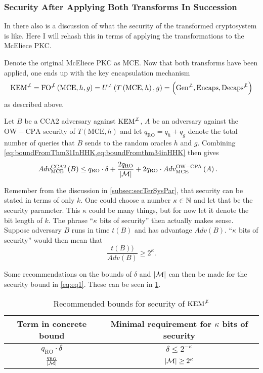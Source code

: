\subsubsection{Security After Applying Both Transforms In Succession}
\label{subsec:SecAftAppBotTraInSuc}

In \cite{HHK} there also is a discussion of what the security of the transformed cryptosystem is like. Here I will rehash this in terms of applying the transformations to the McEliece PKC.

Denote the original McEliece PKC as $\mathrm{MCE}$. Now that both transforms have been applied, one ends up with the key encapsulation mechanism
\[
	\mathrm{KEM}^{\not\bot} = \mathrm{FO}^{\not\bot}\left(\mathrm{MCE}, h, g\right) = U^{\not\bot}\left(T\left(\mathrm{MCE},h\right),g\right) = \left(\mathrm{Gen}^{\not\bot}, \mathrm{Encaps}, \mathrm{Decaps}^{\not\bot}\right)
\]
as described above.

Let $B$ be a $\mathrm{CCA}2$ adversary against $\mathrm{KEM}^{\not\bot}$, $A$ be an adversary against the $\mathrm{OW-CPA}$ security of $T\left(\mathrm{MCE},h\right)$ and let $q_{\mathrm{RO}} = q_h + q_g$ denote the total number of queries that $B$ sends to the random oracles $h$ and $g$. Combining \cref{eq:boundFromThm31InHHK,eq:boundFromthm34inHHK} then gives
\begin{align}
	Adv_{\mathrm{MCE}}^{\mathrm{CCA}2}\left(B\right) &\leq q_{\mathrm{RO}} \cdot \delta + \frac{2 q_{\mathrm{RO}}}{\left\vert \mathcal{M} \right\vert} + 2 q_{\mathrm{RO}} \cdot Adv_{\mathrm{MCE}}^{\mathrm{OW-CPA}}\left(A\right).\label{eq:eq1}
\end{align}

Remember from the discussion in \cref{subsec:secTerSysPar}, that security can be stated in terms of only $k$. One could choose a number $\kappa \in \mathbb{N}$ and let that be the security parameter. This $\kappa$ could be many things, but for now let it denote the bit length of $k$. The phrase ``$\kappa$ bits of security'' then actually makes sense. Suppose adversary $B$ runs in time $t\left(B\right)$ and has advantage $Adv\left(B\right)$. ``$\kappa$ bits of security'' would then mean that
\[
	\frac{t\left(B\right))}{Adv\left(B\right)} \geq 2^{\kappa}.
\]

Some recommendations on the bounds of $\delta$ and $\left\vert \mathcal{M} \right\vert$ can then be made for the security bound in \cref{eq:eq1}. These can be seen in \cref{tab:recBouForSecOfKEM}.
\begin{table}[htb!]
\centering
\begin{tabular}{cc}
	\hline
	Term in concrete bound & Minimal requirement for $\kappa$ bits of security\\
	\hline
	$q_{\mathrm{RO}} \cdot \delta$ & $\delta \leq 2^{- \kappa}$\\
	$\frac{q_{\mathrm{RO}}}{\left\vert \mathcal{M} \right\vert}$ & $\left\vert \mathcal{M} \right\vert \geq 2^{\kappa}$
\end{tabular}
\caption{Recommended bounds for security of $\mathrm{KEM}^{\not\bot}$}
\label{tab:recBouForSecOfKEM}
\end{table}

